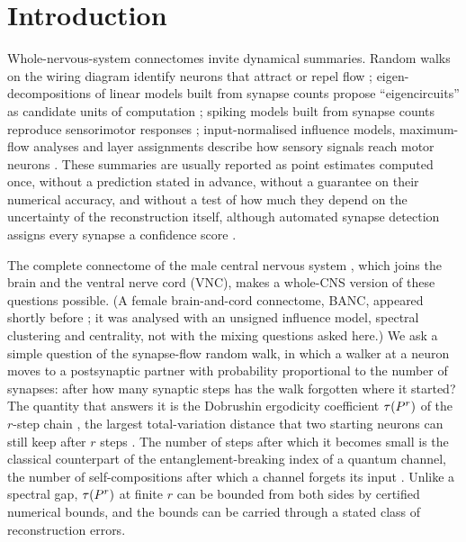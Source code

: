 \section{Introduction}\label{sec:intro}

Whole-nervous-system connectomes invite dynamical summaries. Random walks on the wiring diagram
identify neurons that attract or repel flow \cite{lin2024}; eigen-decompositions of linear models
built from synapse counts propose ``eigencircuits'' as candidate units of computation
\cite{pospisil2024}; spiking models built from synapse counts reproduce sensorimotor responses
\cite{shiu2024}; input-normalised influence models, maximum-flow analyses and layer
assignments describe how sensory signals reach motor neurons \cite{schlegel2021,winding2023,bates2026,berg2026}.
These summaries are usually reported as point estimates computed once, without a prediction stated
in advance, without a guarantee on their numerical accuracy, and without a test of how much they
depend on the uncertainty of the reconstruction itself, although automated synapse detection
assigns every synapse a confidence score \cite{buhmann2021,berg2026}.

The complete connectome of the male \Dros{} central nervous system \cite{berg2026,malecnsdata},
which joins the brain and the ventral nerve cord (VNC), makes a whole-CNS version of these questions
possible. (A female brain-and-cord connectome, BANC, appeared shortly before \cite{bates2026}; it was
analysed with an unsigned influence model, spectral clustering and centrality, not with the mixing
questions asked here.) We ask a simple question of the synapse-flow random walk, in which a walker
at a neuron moves to a postsynaptic partner with probability proportional to the number of
synapses: after how many synaptic steps has the walk forgotten where it started? The quantity that
answers it is the Dobrushin ergodicity coefficient $\tau(P^r)$ of the $r$-step chain
\cite{dobrushin1956,seneta2006}, the largest total-variation distance that two starting neurons can
still keep after $r$ steps \cite{levin2017}. The number of steps after which it becomes small is the
classical counterpart of the entanglement-breaking index of a quantum channel, the number of
self-compositions after which a channel forgets its input \cite{kopel2026a}. Unlike a spectral gap, $\tau(P^r)$ at finite $r$ can be bounded from both sides
by certified numerical bounds, and the bounds can be carried through a stated class of
reconstruction errors.

